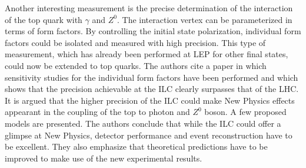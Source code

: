 Another interesting measurement is the precise determination of the interaction of the top quark with $γ$ and $Z^0$.
The interaction vertex can be parameterized in terms of form factors.
By controlling the initial state polarization, individual form factors could be isolated and measured with high precision.
This type of measurement, which has already been performed at LEP for other final states, could now be extended to top quarks.
The authors cite a paper\cite{study} in which sensitivity studies for the individual form factors have been performed and which shows that the precision achievable at the ILC clearly surpasses that of the LHC.
It is argued that the higher precision of the ILC could make New Physics effects appearant in the coupling of the top to photon and $Z^0$ boson.
A few proposed models are presented.
The authors conclude that while the ILC could offer a glimpse at New Physics, detector performance and event reconstruction have to be excellent.
They also emphasize that theoretical predictions have to be improved to make use of the new experimental results.
